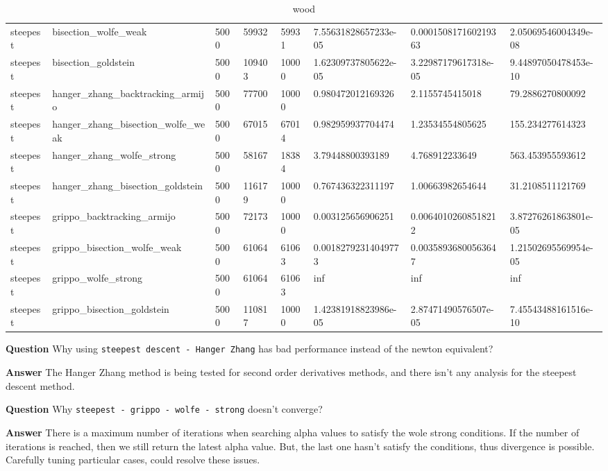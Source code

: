 \documentclass[a4paper,11pt]{article}
\numberwithin{equation}{section} %
\begin{document}
\begin{table}[h!]
{\begin{tabular}{|l|l|l|l|l|l|l|l|}
        steepest & bisection\_wolfe\_weak & 5000 & 59932 & 59931 & 7.55631828657233e-05 & 0.000150817160219363 & 2.05069546004349e-08 \\
        steepest & bisection\_goldstein & 5000 & 109403 & 10000 & 1.62309737805622e-05 & 3.22987179617318e-05 & 9.44897050478453e-10 \\
        steepest & hanger\_zhang\_backtracking\_armijo & 5000 & 77700 & 10000 & 0.980472012169326 & 2.1155745415018 & 79.2886270800092 \\
        steepest & hanger\_zhang\_bisection\_wolfe\_weak & 5000 & 67015 & 67014 & 0.982959937704474 & 1.23534554805625 & 155.234277614323 \\
        steepest & hanger\_zhang\_wolfe\_strong & 5000 & 58167 & 18384 & 3.79448800393189 & 4.768912233649 & 563.453955593612 \\
        steepest & hanger\_zhang\_bisection\_goldstein & 5000 & 116179 & 10000 & 0.767436322311197 & 1.00663982654644 & 31.2108511121769 \\
        steepest & grippo\_backtracking\_armijo & 5000 & 72173 & 10000 & 0.003125656906251 & 0.00640102608518212 & 3.87276261863801e-05 \\
        steepest & grippo\_bisection\_wolfe\_weak & 5000 & 61064 & 61063 & 0.00182792314049773 & 0.00358936800563647 & 1.21502695569954e-05 \\
        steepest & grippo\_wolfe\_strong & 5000 & 61064 & 61063 & inf & inf & inf \\
        steepest & grippo\_bisection\_goldstein & 5000 & 110817 & 10000 & 1.42381918823986e-05 & 2.87471490576507e-05 & 7.45543488161516e-10 \\
\end{tabular}}
\caption{wood}
\label{table:wood}
\end{table}

\clearpage

\textbf{Question}
Why using \verb|steepest descent - Hanger Zhang| has bad performance instead of the newton equivalent?

\textbf{Answer}
The Hanger Zhang method is being tested for second order derivatives methods, and there isn't any analysis for the steepest descent method.

\textbf{Question}
Why \verb|steepest - grippo - wolfe - strong| doesn't converge?

\textbf{Answer}
There is a maximum number of iterations when searching alpha values to satisfy the wole strong conditions. If the number of iterations is reached, then we still return the latest alpha value. But, the last one hasn't satisfy the conditions, thus divergence is possible. Carefully tuning particular cases, could resolve these issues.
\end{document}
